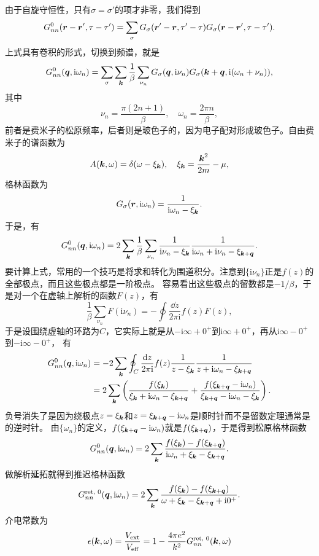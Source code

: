 \documentclass[hyperref, UTF8, a4paper]{ctexart}
\newcommand*{\ii}{\mathrm{i}}
\begin{document}
由于自旋守恒性，只有$\sigma = \sigma'$的项才非零，我们得到
\[
    G_{nn}^\text{0}(\vb*{r}-\vb*{r}', \tau-\tau') = \sum_\sigma G_\sigma(\vb*{r}' - \vb*{r}, \tau' - \tau) G_\sigma(\vb*{r} - \vb*{r}', \tau - \tau').
\]
上式具有卷积的形式，切换到频谱，就是
\[
    G_{nn}^\text{0}(\vb*{q}, \ii \omega_n) = \sum_{\sigma} \sum_{\vb*{k}} \frac{1}{\beta} \sum_{\nu_n} G_\sigma(\vb*{q}, \ii \nu_n) G_\sigma(\vb*{k} + \vb*{q}, \ii (\omega_n + \nu_n)),
\]
其中
\[
    \nu_n = \frac{\pi(2n+1)}{\beta}, \quad \omega_n = \frac{2\pi n}{\beta},
\]
前者是费米子的松原频率，后者则是玻色子的，因为电子配对形成玻色子。自由费米子的谱函数为
\[
    A(\vb*{k}, \omega) = \delta(\omega - \xi_{\vb*{k}}), \quad \xi_{\vb*{k}} = \frac{\vb*{k}^2}{2m} - \mu,
\]
格林函数为
\[
    G_\sigma(\vb*{r}, \ii \omega_n) = \frac{1}{\ii \omega_n - \xi_{\vb*{k}}}.
\]
于是，有
\[
    G_{nn}^\text{0}(\vb*{q}, \ii \omega_n) = 2 \sum_{\vb*{k}} \frac{1}{\beta} \sum_{\nu_n} \frac{1}{\ii \nu_n - \xi_{\vb*{k}}} \frac{1}{\ii \omega_n + \ii \nu_n - \xi_{\vb*{k}+\vb*{q}}}.
\]
要计算上式，常用的一个技巧是将求和转化为围道积分。注意到$\{\ii \nu_n\}$正是$f(z)$的全部极点，而且这些极点都是一阶极点。
容易看出这些极点的留数都是$-1/\beta$，于是对一个在虚轴上解析的函数$F(z)$，有
\[
    \frac{1}{\beta} \sum_{\nu_n} F(\ii \nu_n) = - \oint \frac{\dd{z}}{2\pi \ii} f(z) F(z),
\]
于是设围绕虚轴的环路为$C$，它实际上就是从$-\ii \infty + 0^+$到$\ii \infty + 0^+$，再从$\ii \infty - 0^+$到$-\ii \infty - 0^+$，
有
\[
    \begin{aligned}
        G_{nn}^\text{0}(\vb*{q}, \ii \omega_n) &= - 2 \sum_{\vb*{k}} \oint_C \frac{\dd{z}}{2\pi \ii} f(z) \frac{1}{z - \xi_{\vb*{k}}} \frac{1}{z +  \ii \omega_n - \xi_{\vb*{k}+\vb*{q}}} \\
        &= 2 \sum_{\vb*{k}} \left( \frac{f(\xi_{\vb*{k}})}{\xi_{\vb*{k}} + \ii \omega_n - \xi_{\vb*{k} + \vb*{q}}} + \frac{f(\xi_{\vb*{k} + \vb*{q}} - \ii \omega_n)}{\xi_{\vb*{k} + \vb*{q}} - \ii \omega_n - \xi_{\vb*{k}}} \right).
    \end{aligned}
\]
负号消失了是因为绕极点$z=\xi_{\vb*{k}}$和$z = \xi_{\vb*{k} + \vb*{q}} - \ii \omega_n$是顺时针而不是留数定理通常是的逆时针。
由$\{\omega_n\}$的定义，$f(\xi_{\vb*{k} + \vb*{q}} - \ii \omega_n)$就是$f(\xi_{\vb*{k} + \vb*{q}})$，于是得到松原格林函数
\begin{equation}
    G_{nn}^\text{0}(\vb*{q}, \ii \omega_n) = 2 \sum_{\vb*{k}} \frac{f(\xi_{\vb*{k}}) - f(\xi_{\vb*{k} + \vb*{q}})}{\ii \omega_n + \xi_{\vb*{k}} - \xi_{\vb*{k} + \vb*{q}}}.
\end{equation}
做解析延拓就得到推迟格林函数
\begin{equation}
    G_{nn}^\text{ret, 0}(\vb*{q}, \ii \omega_n) = 2 \sum_{\vb*{k}} \frac{f(\xi_{\vb*{k}}) - f(\xi_{\vb*{k} + \vb*{q}})}{\omega + \xi_{\vb*{k}} - \xi_{\vb*{k} + \vb*{q}} + \ii 0^+}.
    \label{eq:ext-electron-retarded-green-function}
\end{equation}
介电常数为
\begin{equation}
    \epsilon(\vb*{k}, \omega) = \frac{V_\text{ext}}{V_\text{eff}} = 1 - \frac{4 \pi e^2}{k^2} G^\text{ret, 0}_{nn}(\vb*{k}, \omega)
\end{equation}
\end{document}
